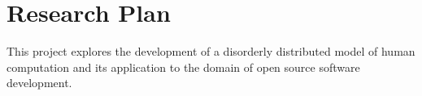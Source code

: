 
\section*{Research Plan} %
\label{sec:research-plan}

This project explores the development of a disorderly distributed model of human computation and its application to the domain of open source software development.

